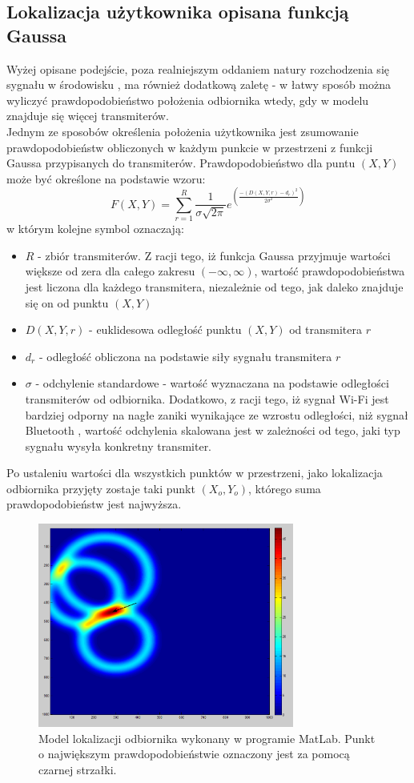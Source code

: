 \subsection{Lokalizacja użytkownika opisana funkcją Gaussa}
Wyżej opisane podejście, poza realniejszym oddaniem natury rozchodzenia się sygnału w środowisku \cite{TDECHN}, ma również dodatkową zaletę - w łatwy sposób można wyliczyć prawdopodobieństwo położenia odbiornika wtedy, gdy w modelu znajduje się więcej transmiterów.\\
Jednym ze sposobów określenia położenia użytkownika jest zsumowanie prawdopodobieństw obliczonych w każdym punkcie w przestrzeni z funkcji Gaussa przypisanych do transmiterów. Prawdopodobieństwo dla puntu $(X,Y)$ może być określone na podstawie wzoru:
\begin{equation}
F(X,Y) = \sum_{r=1}^{R} \frac{1}{\sigma\sqrt{2\pi}}e^{\left(\frac{-(D(X,Y,r)-d_r)^2}{2\sigma^2}\right)}
\end{equation}
w którym kolejne symbol oznaczają:
\begin{itemize}
	\item $R$ - zbiór transmiterów. Z racji tego, iż funkcja Gaussa przyjmuje wartości większe od zera dla całego zakresu $(-\infty,\infty)$, wartość prawdopodobieństwa jest liczona dla każdego transmitera, niezależnie od tego, jak daleko znajduje się on od punktu $(X,Y)$
	\item $D(X,Y,r)$ - euklidesowa odległość punktu $(X,Y)$ od transmitera $r$
	\item $d_r$ - odległość obliczona na podstawie siły sygnału transmitera $r$
	\item $\sigma$ - odchylenie standardowe - wartość wyznaczana na podstawie odległości transmiterów od odbiornika. Dodatkowo, z racji tego, iż sygnał Wi-Fi jest bardziej odporny na nagłe zaniki wynikające ze wzrostu odległości, niż sygnał Bluetooth \cite{BLUE}, wartość odchylenia skalowana jest w zależności od tego, jaki typ sygnału wysyła konkretny transmiter.
\end{itemize}
Po ustaleniu wartości dla wszystkich punktów w przestrzeni, jako lokalizacja odbiornika przyjęty zostaje taki punkt $(X_o,Y_o)$, którego suma prawdopodobieństw jest najwyższa.
\begin{figure}[H]			
	\centering
	\caption{Model lokalizacji odbiornika wykonany w programie MatLab. Punkt o największym prawdopodobieństwie oznaczony jest za pomocą czarnej strzałki.}
	\includegraphics[width=0.75\textwidth]{guasianRouter}
\end{figure}
